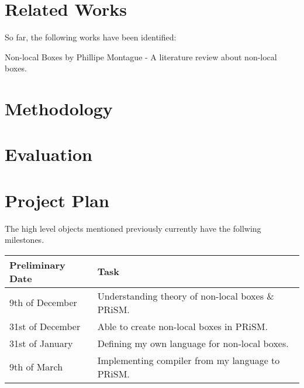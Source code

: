 \documentclass[11pt, a4paper]{article}
\begin{document}

\section{Related Works} %
\label{sec:related_works}
So far, the following works have been identified:

Non-local Boxes by Phillipe Montague\cite{nlb_lamontague} - A literature review
about non-local boxes.


\section{Methodology} %
\label{sec:methodology}


\section{Evaluation} %
\label{sec:evaluation}


\section{Project Plan} %
\label{sec:project_plan}
The high level objects mentioned previously currently have the follwing
milestones.

\begin{center}
    \begin{tabular}{l | p{7.5cm}}
        Preliminary Date & Task \\
        \hline
        9th of December & Understanding theory of non-local boxes \& PRiSM. \\

        31st of December & Able to create non-local boxes in PRiSM. \\

        31st of January & Defining my own language for non-local boxes. \\

        9th of March & Implementing compiler from my language to PRiSM. \\
\end{tabular}
\end{center}

\end{document}
